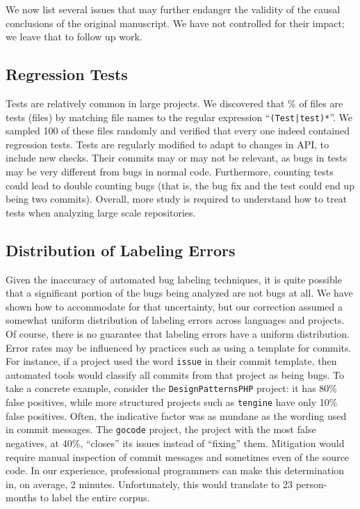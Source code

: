 \documentclass[acmsmall]{acmart}
\newcommand{\pct}[1]{#1\!\!\%\xspace}
\newcommand{\code}[1]{{\tt\small #1}\xspace}
\begin{document}
We now list several issues that may further endanger
the validity of the causal conclusions of the original manuscript. We 
have not controlled for their impact; we leave that to follow up work.

\subsection{Regression Tests}
Tests are relatively common in large projects. 
We discovered that
\pct{\ratioTestsFiles} of files are tests (\testFilesCommitted files) by 
matching file
names to the regular expression ``\code{*(Test|test)*}''. We sampled 100 of
these files randomly and verified that every one indeed contained 
regression tests. Tests are regularly modified to adapt to changes in API,
to include new checks. Their commits may or may not be relevant, as
bugs in tests may be very different from bugs in normal code. Furthermore,
counting tests could lead to double counting bugs (that is, the bug fix and
the test could end up being two commits). Overall, more study is required to
understand how to treat tests when analyzing large scale repositories.

\subsection{Distribution of Labeling Errors}

Given the inaccuracy of automated bug labeling techniques, it is quite
possible that a significant portion of the bugs being analyzed are not
bugs at all. We have shown how to accommodate for that uncertainty, but
our correction assumed a somewhat uniform distribution of labeling
errors across languages and projects.
Of course, there is no guarantee that labeling errors have a uniform
distribution.  Error rates may be influenced by practices such as using a
template for commits. For instance, if a project used the word \code{issue}
in their commit template, then automated tools would classify all commits
from that project as being bugs. To take a concrete example, consider the
\code{Design\-Patterns\-PHP} project: it has 80\% false positives, while
more structured projects such as \code{tengine} have only 10\% false
positives. Often, the indicative factor was as mundane as the wording used
in commit messages. The \code{gocode} project, the project with the most
false negatives, at 40\%, ``closes'' its issues instead of ``fixing'' them.
Mitigation would require manual inspection of commit messages and sometimes
even of the source code. In our experience, professional programmers can
make this determination in, on average, 2 minutes.  Unfortunately, this
would translate to 23 person-months to label the entire corpus.
\end{document}
